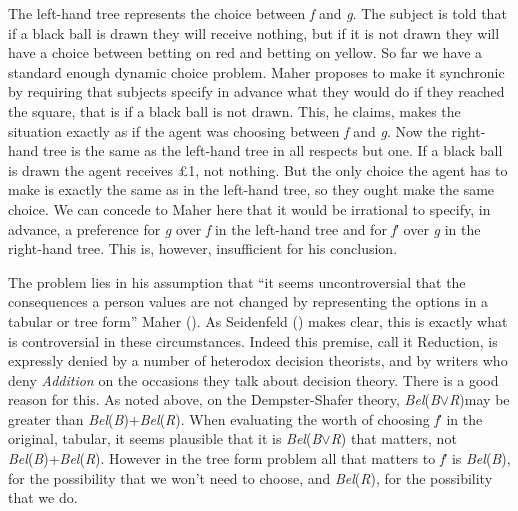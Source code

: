 \documentclass[
  10pt,
  letterpaper,
  DIV=11,
  numbers=noendperiod,
  twoside]{scrartcl}
\begin{document}
The left-hand tree represents the choice between \emph{f} and \emph{g}.
The subject is told that if a black ball is drawn they will receive
nothing, but if it is not drawn they will have a choice between betting
on red and betting on yellow. So far we have a standard enough dynamic
choice problem. Maher proposes to make it synchronic by requiring that
subjects specify in advance what they would do if they reached the
square, that is if a black ball is not drawn. This, he claims, makes the
situation exactly as if the agent was choosing between \emph{f} and
\emph{g}. Now the right-hand tree is the same as the left-hand tree in
all respects but one. If a black ball is drawn the agent receives £1,
not nothing. But the only choice the agent has to make is exactly the
same as in the left-hand tree, so they ought make the same choice. We
can concede to Maher here that it would be irrational to specify, in
advance, a preference for \emph{g} over \emph{f} in the left-hand tree
and for \emph{f}′ over \emph{g} in the right-hand tree. This is,
however, insufficient for his conclusion.

The problem lies in his assumption that ``it seems uncontroversial that
the consequences a person values are not changed by representing the
options in a tabular or tree form'' Maher
(). As Seidenfeld
() makes clear, this is exactly what
is controversial in these circumstances. Indeed this premise, call it
Reduction, is expressly denied by a number of heterodox decision
theorists, and by writers who deny \emph{Addition} on the occasions they
talk about decision theory. There is a good reason for this. As noted
above, on the Dempster-Shafer theory,
\emph{Bel}(\emph{B}\({\vee}\)\emph{R})may be greater than
\emph{Bel}(\emph{B})+\emph{Bel}(\emph{R}). When evaluating the worth of
choosing \emph{f}′ in the original, tabular, it seems plausible that it
is \emph{Bel}(\emph{B}\({\vee}\)\emph{R}) that matters, not
\emph{Bel}(\emph{B})+\emph{Bel}(\emph{R}). However in the tree form
problem all that matters to \emph{f}′ is \emph{Bel}(\emph{B}), for the
possibility that we won't need to choose, and \emph{Bel}(\emph{R}), for
the possibility that we do.
\end{document}
